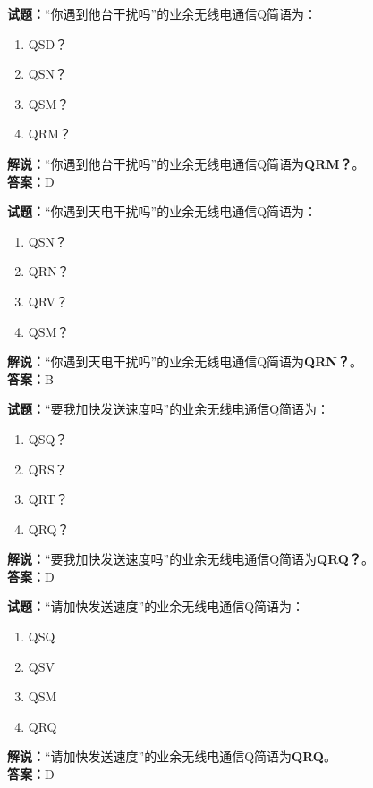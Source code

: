 \documentclass{ctexbook}
\begin{document}
\bigskip


\noindent\textbf{试题：}“你遇到他台干扰吗”的业余无线电通信Q简语为：
\begin{enumerate}[leftmargin=3em]
\item QSD？
\item QSN？
\item QSM？
\item QRM？
\end{enumerate}
\noindent\textbf{解说：}“你遇到他台干扰吗”的业余无线电通信Q简语为\textbf{QRM？}。\\\noindent\textbf{答案：}D



\bigskip


\noindent\textbf{试题：}“你遇到天电干扰吗”的业余无线电通信Q简语为：
\begin{enumerate}[leftmargin=3em]
\item QSN？
\item QRN？
\item QRV？
\item QSM？
\end{enumerate}
\noindent\textbf{解说：}“你遇到天电干扰吗”的业余无线电通信Q简语为\textbf{QRN？}。\\\noindent\textbf{答案：}B



\bigskip


\noindent\textbf{试题：}“要我加快发送速度吗”的业余无线电通信Q简语为：
\begin{enumerate}[leftmargin=3em]
\item QSQ？
\item QRS？
\item QRT？
\item QRQ？
\end{enumerate}
\noindent\textbf{解说：}“要我加快发送速度吗”的业余无线电通信Q简语为\textbf{QRQ？}。\\\noindent\textbf{答案：}D



\bigskip


\noindent\textbf{试题：}“请加快发送速度”的业余无线电通信Q简语为：
\begin{enumerate}[leftmargin=3em]
\item QSQ
\item QSV
\item QSM
\item QRQ
\end{enumerate}
\noindent\textbf{解说：}“请加快发送速度”的业余无线电通信Q简语为\textbf{QRQ}。\\\noindent\textbf{答案：}D
\end{document}
